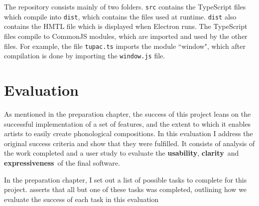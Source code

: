 \documentclass[12pt,a4paper,oneside,openright]{report}
\newcommand{\usability}{\textbf{usability}}
\newcommand{\clarity}{\textbf{clarity}}
\newcommand{\expressiveness}{\textbf{expressiveness}}
\begin{document}
\DTsetlength{0.2em}{1em}{0.2em}{0.4pt}{2pt}
\setlength{\DTbaselineskip}{20pt}

The repository consists mainly of two folders. \verb|src| contains the TypeScript files which compile into \verb|dist|, which contains the files used at runtime. \verb|dist| also contains the HMTL file which is displayed when Electron runs. The TypeScript files compile to CommonJS modules, which are imported and used by the other files. For example, the file \verb|tupac.ts| imports the module ``window", which after compilation is done by importing the \verb|window.js| file.

\chapter{Evaluation}
As mentioned in the preparation chapter, the success of this project leans on the successful implementation of a set of features, and the extent to which it enables artists to easily create phonological compositions. In this evaluation I address the original success criteria and show that they were fulfilled. It consists of analysis of the work completed and a user study to evaluate the \usability, \clarity\ and \expressiveness\ of the final software.

In the preparation chapter, I set out a list of possible tasks to complete for this project.  asserts that all but one of these tasks was completed, outlining how we evaluate the success of each task in this evaluation
\end{document}
